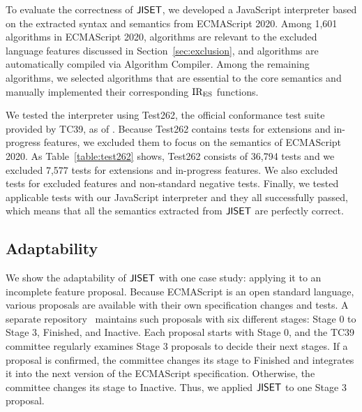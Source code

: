 To evaluate the correctness of \( \text{\sf JISET} \), we developed a JavaScript
interpreter based on the extracted syntax and semantics from
ECMAScript 2020.  Among 1,601 algorithms in ECMAScript 2020,
 algorithms are relevant to the excluded language features
discussed in Section~\ref{sec:exclusion}, and  algorithms
are automatically compiled via \textsf{Algorithm Compiler}.
Among the remaining  algorithms, we selected 
algorithms that are essential to the core semantics and manually
implemented their corresponding \( \text{IR}_\text{ES} \) functions.

We tested the interpreter using Test262, the official conformance test
suite provided by TC39, as of .  Because Test262
contains tests for extensions and in-progress features, we excluded
them to focus on the semantics of ECMAScript 2020.  As Table~\ref{table:test262} shows,
Test262 consists of 36,794 tests and we excluded 7,577 tests for
extensions and in-progress features.  We also excluded 
tests for excluded features and non-standard negative tests.
Finally, we tested  applicable tests with our JavaScript
interpreter and they all successfully passed, which means that all the
semantics extracted from \( \text{\sf JISET} \) are perfectly correct.


\subsection{Adaptability}
We show the adaptability of \( \text{\sf JISET} \) with one case study: applying
it to an incomplete feature proposal.  Because ECMAScript is an open
standard language, various proposals are available with their own
specification changes and tests.  A
separate repository~\cite{proposals} maintains such proposals with six
different stages: Stage 0 to Stage 3, Finished, and Inactive.  Each
proposal starts with Stage 0, and the TC39 committee regularly
examines Stage 3 proposals to decide their next stages.  If a proposal
is confirmed, the committee changes its stage to Finished and
integrates it into the next version of the ECMAScript specification.
Otherwise, the committee changes its stage to Inactive.  Thus, we
applied \( \text{\sf JISET} \) to one Stage 3 proposal.

